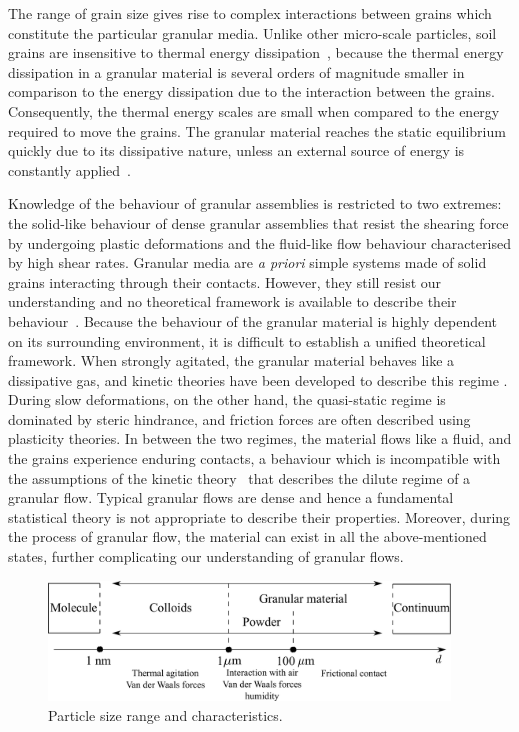 The range of grain size gives rise to complex interactions between grains 
which constitute the particular granular media. Unlike other micro-scale 
particles, soil grains are insensitive to thermal energy 
dissipation~\citep{Mehta2011}, because the thermal energy 
dissipation in a granular material is several orders of magnitude smaller in 
comparison to the energy dissipation due to the interaction between the grains. 
Consequently, the thermal energy scales are small when compared to the energy 
required to move the grains. The granular material reaches the static 
equilibrium quickly due to its dissipative nature, unless an external source of 
energy is 
constantly applied~\citep{Choi2005}. 

Knowledge of the behaviour of granular assemblies 
is restricted to two extremes: the solid-like behaviour of dense granular 
assemblies that resist the shearing force by undergoing plastic deformations 
and the fluid-like flow behaviour characterised by high shear rates. Granular 
media are \textit{a priori} simple systems made of solid grains interacting 
through their contacts. However, they still resist our understanding and no 
theoretical framework is available to describe their 
behaviour~\citep{Pouliquen2006}. Because the behaviour of the granular material 
is highly dependent on its surrounding environment, it is difficult to 
establish a unified theoretical framework. When strongly agitated, the granular 
material behaves like a dissipative gas, and kinetic theories have been 
developed to describe this regime \citep{Xu2003,Popken1999}. During slow 
deformations, on the other hand, the quasi-static regime is dominated by steric 
hindrance, and friction forces are often described using plasticity theories. 
In between the two regimes, the material flows like a fluid, and the grains 
experience enduring contacts, a behaviour which is incompatible with the 
assumptions of the kinetic theory~\citep{Pouliquen2006} that describes the 
dilute regime of a granular flow. Typical granular flows are dense and hence a 
fundamental statistical theory is not appropriate to describe their properties. 
Moreover, during the process of granular flow, the material can exist in all 
the above-mentioned states, further complicating our understanding of 
granular flows.

\begin{figure}[htbp]
\centering
\includegraphics[width=0.95\textwidth]{Granular}
\caption{Particle size range and characteristics.}
\label{fig:granular}
\end{figure}

